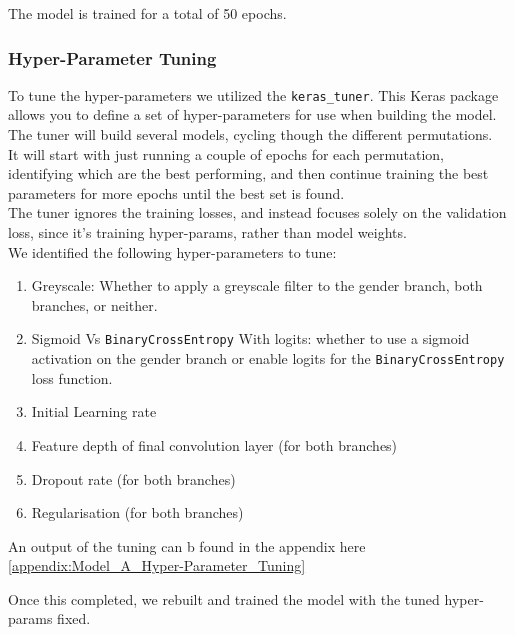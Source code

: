 The model is trained for a total of 50 epochs.

\begin{optional}
    \subsubsection{Hyper-Parameter Tuning}
    To tune the hyper-parameters we utilized the \verb|keras_tuner|.
    This Keras package allows you to define a set of hyper-parameters for use when building the model. 
    The tuner will build several models, cycling though the different permutations.\\
    It will start with just running a couple of epochs for each permutation, identifying which are the best performing, and then continue training the best parameters for more epochs until the best set is found.\\
    The tuner ignores the training losses, and instead focuses solely on the validation loss, since it's training hyper-params, rather than model weights.\\
    We identified the following hyper-parameters to tune:
    \begin{enumerate}
        \item Greyscale: Whether to apply a greyscale filter to the gender branch, both branches, or neither.
        \item Sigmoid Vs \verb|BinaryCrossEntropy| With logits: whether to use a sigmoid activation on the gender branch or enable logits for the \verb|BinaryCrossEntropy| loss function.
        \item Initial Learning rate
        \item Feature depth of final convolution layer (for both branches)
        \item Dropout rate (for both branches)
        \item Regularisation (for both branches)
    \end{enumerate}
    An output of the tuning can b found in the appendix here \autoref{appendix:Model_A_Hyper-Parameter_Tuning}

    Once this completed, we rebuilt and trained the model with the tuned hyper-params fixed.
\end{optional}

